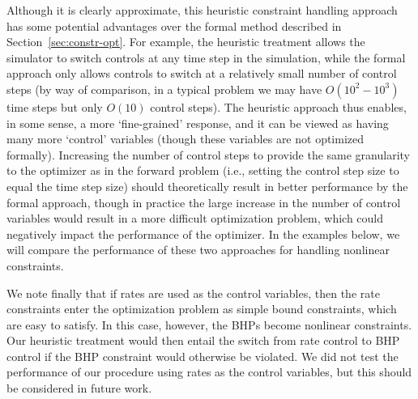 \documentclass[twocolumn,numbook]{svjour3}          %
\begin{document}
Although it is clearly approximate, this heuristic constraint handling approach
has some potential advantages over the formal method described in
Section~\ref{sec:constr-opt}. For example, the heuristic treatment allows the
simulator to switch controls at any time step in the simulation, while the
formal approach only allows controls to switch at a relatively small number of
control steps (by way of comparison, in a typical problem we may have
  $O(10^2-10^3)$ time steps but only $O(10)$ control steps). The heuristic
approach thus enables, in some sense, a more `fine-grained' response, and it can
be viewed as having many more `control' variables (though these variables are
  not optimized formally). Increasing the number of control steps to provide the
same granularity to the optimizer as in the forward problem (i.e., setting the
  control step size to equal the time step size) should theoretically result in
better performance by the formal approach, though in practice the large
increase in the number of control variables would result in a more difficult optimization
problem, which could negatively impact the performance of the optimizer. In the examples
below, we will compare the performance of these two approaches for handling
nonlinear constraints.

We note finally that if rates are used as the control variables, then the rate
constraints enter the optimization problem as simple bound constraints, which
are easy to satisfy. In this case, however, the BHPs become nonlinear
constraints. Our heuristic treatment would then entail the switch from rate
control to BHP control if the BHP constraint would otherwise be violated. We did
not test the performance of our procedure using rates as the control variables,
but this should be considered in future work.

%
\end{document}
